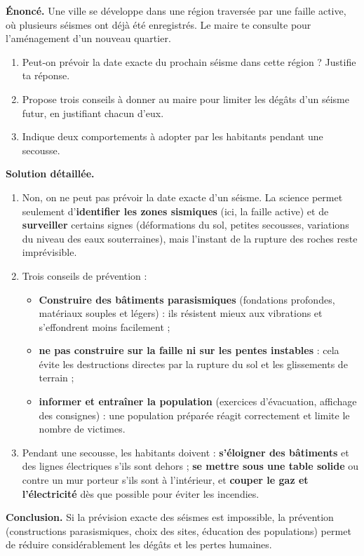 \documentclass[11pt]{article}
\begin{document}
\begin{exoresolu}
\textbf{Énoncé.} Une ville se développe dans une région traversée par une faille active, où plusieurs séismes ont déjà été enregistrés. Le maire te consulte pour l'aménagement d'un nouveau quartier.
\begin{enumerate}
\item Peut-on prévoir la date exacte du prochain séisme dans cette région ? Justifie ta réponse.
\item Propose trois conseils à donner au maire pour limiter les dégâts d'un séisme futur, en justifiant chacun d'eux.
\item Indique deux comportements à adopter par les habitants pendant une secousse.
\end{enumerate}
\tcblower
\textbf{Solution détaillée.}
\begin{enumerate}
\item Non, on ne peut pas prévoir la date exacte d'un séisme. La science permet seulement d'\textbf{identifier les zones sismiques} (ici, la faille active) et de \textbf{surveiller} certains signes (déformations du sol, petites secousses, variations du niveau des eaux souterraines), mais l'instant de la rupture des roches reste imprévisible.
\item Trois conseils de prévention :
\begin{itemize}
\item \textbf{Construire des bâtiments parasismiques} (fondations profondes, matériaux souples et légers) : ils résistent mieux aux vibrations et s'effondrent moins facilement ;
\item \textbf{ne pas construire sur la faille ni sur les pentes instables} : cela évite les destructions directes par la rupture du sol et les glissements de terrain ;
\item \textbf{informer et entraîner la population} (exercices d'évacuation, affichage des consignes) : une population préparée réagit correctement et limite le nombre de victimes.
\end{itemize}
\item Pendant une secousse, les habitants doivent : \textbf{s'éloigner des bâtiments} et des lignes électriques s'ils sont dehors ; \textbf{se mettre sous une table solide} ou contre un mur porteur s'ils sont à l'intérieur, et \textbf{couper le gaz et l'électricité} dès que possible pour éviter les incendies.
\end{enumerate}
\textbf{Conclusion.} Si la prévision exacte des séismes est impossible, la prévention (constructions parasismiques, choix des sites, éducation des populations) permet de réduire considérablement les dégâts et les pertes humaines.
\end{exoresolu}
\end{document}
